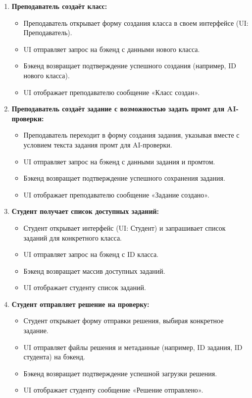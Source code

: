 \begin{enumerate}
    \item \textbf{Преподаватель создаёт класс:}
    \begin{itemize}
        \item Преподаватель открывает форму создания класса в своем интерфейсе (UI: Преподаватель).
        \item UI отправляет запрос на бэкенд с данными нового класса.
        \item Бэкенд возвращает подтверждение успешного создания (например, ID нового класса).
        \item UI отображает преподавателю сообщение «Класс создан».
    \end{itemize}

    \item \textbf{Преподаватель создаёт задание с возможностью задать промт для AI-проверки:}
    \begin{itemize}
        \item Преподаватель переходит в форму создания задания, указывая вместе с условием текста задания промт для AI-проверки.
        \item UI отправляет запрос на бэкенд с данными задания и промтом.
        \item Бэкенд возвращает подтверждение успешного сохранения задания.
        \item UI отображает преподавателю сообщение «Задание создано».
    \end{itemize}

    \item \textbf{Студент получает список доступных заданий:}
    \begin{itemize}
        \item Студент открывает интерфейс (UI: Студент) и запрашивает список заданий для конкретного класса.
        \item UI отправляет запрос на бэкенд с ID класса.
        \item Бэкенд возвращает массив доступных заданий.
        \item UI отображает студенту список заданий.
    \end{itemize}

    \item \textbf{Студент отправляет решение на проверку:}
    \begin{itemize}
        \item Студент открывает форму отправки решения, выбирая конкретное задание.
        \item UI отправляет файлы решения и метаданные (например, ID задания, ID студента) на бэкенд.
        \item Бэкенд возвращает подтверждение успешной загрузки решения.
        \item UI отображает студенту сообщение «Решение отправлено».
    \end{itemize}


\end{enumerate}
